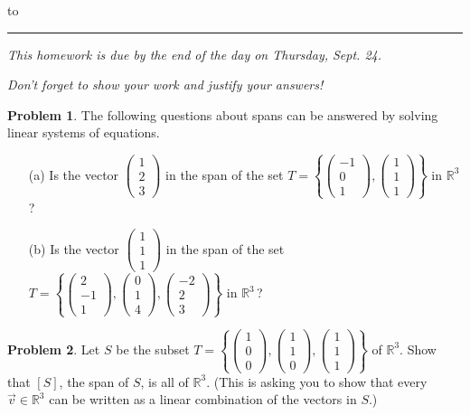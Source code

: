 \documentclass[12pt]{article}
\newcommand{\R}{{\mathbb R}}
\theoremstyle{definition}
\newtheorem{problem}{Problem}
\newenvironment{answer}{\par\bigskip\bgroup\color{darkblue}}{\egroup}
\begin{document}
\hbox to 
\nointerlineskip
\vskip 2pt
\hrule height 1pt

\medskip

\centerline{\textit{This homework is due by the end of the day on Thursday, Sept. 24.}}
\centerline{\textit{Don't forget to show your work and justify your answers!}}

\medskip

\def\vc#1{\begin{pmatrix}#1\end{pmatrix}}

\begin{problem}
The following questions about spans can be answered by solving linear systems of equations.
\begin{enumerate}
\item[(a)] Is the vector $\vc{1\\2\\3}$ in the span of the set 
           $T=\left\{\vc{-1\\0\\1},\vc{1\\1\\1}\right\}$ in $\R^3\,$?
\item[(b)] Is the vector $\vc{1\\1\\1}$ in the span of the set 
           $T=\left\{\vc{2\\-1\\1},\vc{0\\1\\4},\vc{-2\\2\\3}\right\}$ in $\R^3\,$?
\end{enumerate}
\end{problem}

\begin{answer}
\end{answer}



\begin{problem}
Let $S$ be the subset $T=\left\{\vc{1\\0\\0},\vc{1\\1\\0},\vc{1\\1\\1}\right\}$ of $\R^3$.  
Show that $[S]$, the span of $S$, is all of $\R^3$.  (This is asking you to show that every
$\vec v\in\R^3$ can be written as a linear combination of the vectors in $S$.)
\end{problem}
\end{document}

